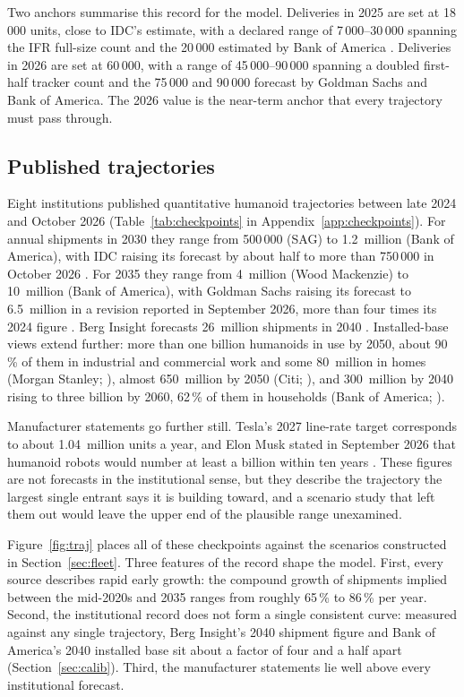 \documentclass[11pt]{article}
\newcommand{\figref}[1]{Figure~\ref{#1}}
\newcommand{\tabref}[1]{Table~\ref{#1}}
\newcommand{\secref}[1]{Section~\ref{#1}}
\begin{document}
Two anchors summarise this record for the model. Deliveries in 2025 are set at 18\,000 units, close to IDC's estimate, with a declared range of 7\,000--30\,000 spanning the IFR full-size count and the 20\,000 estimated by Bank of America \citep{bofa2026}. Deliveries in 2026 are set at 60\,000, with a range of 45\,000--90\,000 spanning a doubled first-half tracker count and the 75\,000 and 90\,000 forecast by Goldman Sachs and Bank of America. The 2026 value is the near-term anchor that every trajectory must pass through.

\subsection{Published trajectories}
Eight institutions published quantitative humanoid trajectories between late 2024 and October 2026 (\tabref{tab:checkpoints} in Appendix~\ref{app:checkpoints}). For annual shipments in 2030 they range from 500\,000 (SAG) to 1.2~million (Bank of America), with IDC raising its forecast by about half to more than 750\,000 in October 2026 \citep{idc2026blog}. For 2035 they range from 4~million (Wood Mackenzie) to 10~million (Bank of America), with Goldman Sachs raising its forecast to 6.5~million in a revision reported in September 2026, more than four times its 2024 figure \citep{gs2026}. Berg Insight forecasts 26~million shipments in 2040 \citep{berg2026}. Installed-base views extend further: more than one billion humanoids in use by 2050, about 90\,\% of them in industrial and commercial work and some 80~million in homes (Morgan Stanley; \citealp{ms2025}), almost 650~million by 2050 (Citi; \citealp{citi2024}), and 300~million by 2040 rising to three billion by 2060, 62\,\% of them in households (Bank of America; \citealp{bofa2026}).

Manufacturer statements go further still. Tesla's 2027 line-rate target corresponds to about 1.04~million units a year, and Elon Musk stated in September 2026 that humanoid robots would number at least a billion within ten years \citep{musk2026}. These figures are not forecasts in the institutional sense, but they describe the trajectory the largest single entrant says it is building toward, and a scenario study that left them out would leave the upper end of the plausible range unexamined.

\figref{fig:traj} places all of these checkpoints against the scenarios constructed in \secref{sec:fleet}. Three features of the record shape the model. First, every source describes rapid early growth: the compound growth of shipments implied between the mid-2020s and 2035 ranges from roughly 65\,\% to 86\,\% per year. Second, the institutional record does not form a single consistent curve: measured against any single trajectory, Berg Insight's 2040 shipment figure and Bank of America's 2040 installed base sit about a factor of four and a half apart (\secref{sec:calib}). Third, the manufacturer statements lie well above every institutional forecast.
\end{document}
